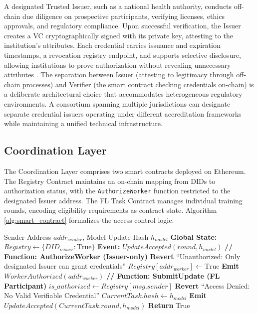 \documentclass[english]{sbc2025}
\begin{document}
A designated Trusted Issuer, such as a national health authority, conducts off-chain due diligence on prospective participants, verifying licenses, ethics approvals, and regulatory compliance. Upon successful verification, the Issuer creates a VC cryptographically signed with its private key, attesting to the institution's attributes. Each credential carries issuance and expiration timestamps, a revocation registry endpoint, and supports selective disclosure, allowing institutions to prove authorization without revealing unnecessary attributes \citep{W3C2019}. The separation between Issuer (attesting to legitimacy through off-chain processes) and Verifier (the smart contract checking credentials on-chain) is a deliberate architectural choice that accommodates heterogeneous regulatory environments. A consortium spanning multiple jurisdictions can designate separate credential issuers operating under different accreditation frameworks while maintaining a unified technical infrastructure.

\subsection{Coordination Layer}

The Coordination Layer comprises two smart contracts deployed on Ethereum. The Registry Contract maintains an on-chain mapping from DIDs to authorization status, with the \texttt{AuthorizeWorker} function restricted to the designated Issuer address. The FL Task Contract manages individual training rounds, encoding eligibility requirements as contract state. Algorithm \ref{alg:smart_contract} formalizes the access control logic.

\begin{algorithm}[h]
\caption{Smart Contract Access Control Logic}
\label{alg:smart_contract}
\begin{algorithmic}[1]
\REQUIRE Sender Address $addr_{sender}$, Model Update Hash $h_{model}$
\STATE \textbf{Global State:} $Registry \leftarrow \{DID_{issuer}: \text{True}\}$
\STATE \textbf{Event:} $UpdateAccepted(round, h_{model})$
\STATE \textbf{// Function: AuthorizeWorker (Issuer-only)}
    \STATE \textbf{Revert} ``Unauthorized: Only designated Issuer can grant credentials''
\ENDIF
\STATE $Registry[addr_{worker}] \leftarrow \text{True}$
\STATE \textbf{Emit} $WorkerAuthorized(addr_{worker})$
\STATE
\STATE \textbf{// Function: SubmitUpdate (FL Participant)}
\STATE $is\_authorized \leftarrow Registry[msg.sender]$
    \STATE \textbf{Revert} ``Access Denied: No Valid Verifiable Credential''
\ENDIF
\STATE $CurrentTask.hash \leftarrow h_{model}$
\STATE \textbf{Emit} $UpdateAccepted(CurrentTask.round, h_{model})$
\STATE \textbf{Return} True
\end{algorithmic}
\end{algorithm}
\end{document}
